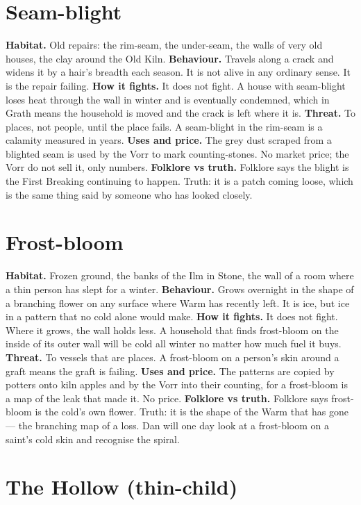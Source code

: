 \documentclass{design/chronicle}
\begin{document}
\section*{Seam-blight}

\textbf{Habitat.} Old repairs: the rim-seam, the under-seam, the walls of very old houses, the clay around the Old Kiln. \textbf{Behaviour.} Travels along a crack and widens it by a hair’s breadth each season. It is not alive in any ordinary sense. It is the repair failing. \textbf{How it fights.} It does not fight. A house with seam-blight loses heat through the wall in winter and is eventually condemned, which in Grath means the household is moved and the crack is left where it is. \textbf{Threat.} To places, not people, until the place fails. A seam-blight in the rim-seam is a calamity measured in years. \textbf{Uses and price.} The grey dust scraped from a blighted seam is used by the Vorr to mark counting-stones. No market price; the Vorr do not sell it, only numbers. \textbf{Folklore vs truth.} Folklore says the blight is the First Breaking continuing to happen. Truth: it is a patch coming loose, which is the same thing said by someone who has looked closely.

\section*{Frost-bloom}

\textbf{Habitat.} Frozen ground, the banks of the Ilm in Stone, the wall of a room where a thin person has slept for a winter. \textbf{Behaviour.} Grows overnight in the shape of a branching flower on any surface where Warm has recently left. It is ice, but ice in a pattern that no cold alone would make. \textbf{How it fights.} It does not fight. Where it grows, the wall holds less. A household that finds frost-bloom on the inside of its outer wall will be cold all winter no matter how much fuel it buys. \textbf{Threat.} To vessels that are places. A frost-bloom on a person’s skin around a graft means the graft is failing. \textbf{Uses and price.} The patterns are copied by potters onto kiln apples and by the Vorr into their counting, for a frost-bloom is a map of the leak that made it. No price. \textbf{Folklore vs truth.} Folklore says frost-bloom is the cold’s own flower. Truth: it is the shape of the Warm that has gone — the branching map of a loss. Dan will one day look at a frost-bloom on a saint’s cold skin and recognise the spiral.

\section*{The Hollow (thin-child)}
\end{document}
